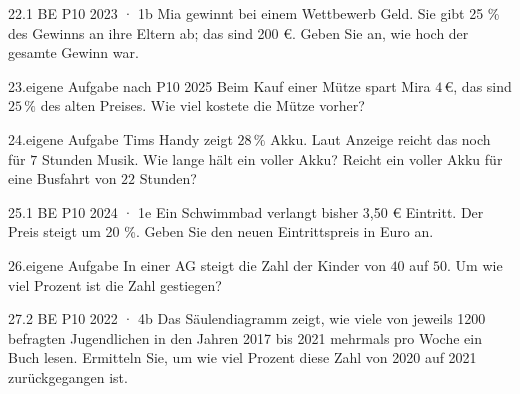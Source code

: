 \documentclass[11pt]{article}
\begin{document}
\begin{pfaufgabe}{22.}{1 BE \textperiodcentered{} P10 2023 · 1b}
Mia gewinnt bei einem Wettbewerb Geld. Sie gibt 25 \% des Gewinns an ihre Eltern ab; das sind 200 €. Geben Sie an, wie hoch der gesamte Gewinn war.
\end{pfaufgabe}
\begin{pfaufgabe}{23.}{eigene Aufgabe nach P10 2025}
Beim Kauf einer Mütze spart Mira $4\,€$, das sind $25\,\%$ des alten Preises. Wie viel kostete die Mütze vorher?
\end{pfaufgabe}
\begin{pfaufgabe}{24.}{eigene Aufgabe}
Tims Handy zeigt $28\,\%$ Akku. Laut Anzeige reicht das noch für $7$ Stunden Musik. Wie lange hält ein voller Akku? Reicht ein voller Akku für eine Busfahrt von $22$ Stunden?
\end{pfaufgabe}
\begin{pfaufgabe}{25.}{1 BE \textperiodcentered{} P10 2024 · 1e}
Ein Schwimmbad verlangt bisher 3,50 € Eintritt. Der Preis steigt um 20 \%. Geben Sie den neuen Eintrittspreis in Euro an.
\end{pfaufgabe}
\begin{pfaufgabe}{26.}{eigene Aufgabe}
In einer AG steigt die Zahl der Kinder von $40$ auf $50$. Um wie viel Prozent ist die Zahl gestiegen?
\end{pfaufgabe}
\begin{pfaufgabe}{27.}{2 BE \textperiodcentered{} P10 2022 · 4b}
Das Säulendiagramm zeigt, wie viele von jeweils 1200 befragten Jugendlichen in den Jahren 2017 bis 2021 mehrmals pro Woche ein Buch lesen. Ermitteln Sie, um wie viel Prozent diese Zahl von 2020 auf 2021 zurückgegangen ist.
\par\smallskip\noindent {}\par
{}
\end{pfaufgabe}
\end{document}
